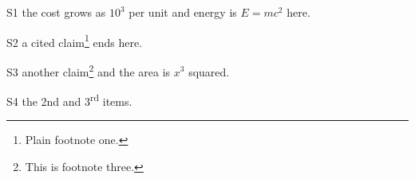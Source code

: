 \documentclass{article}\usepackage[letterpaper,margin=1in]{geometry}\pagestyle{empty}
\begin{document}
S1 the cost grows as $10^{3}$ per unit and energy is $E = mc^2$ here.

S2 a cited claim\footnote{Plain footnote one.} ends here.

S3 \setcounter{footnote}{2}another claim\footnote{This is footnote three.} and the area is $x^{3}$ squared.

S4 the 2nd and 3\textsuperscript{rd} items.
\end{document}
